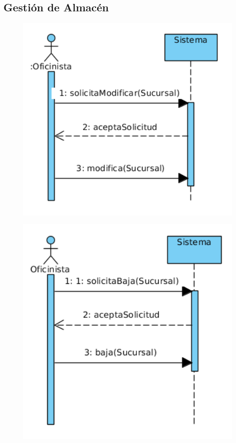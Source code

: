 \subsection{Gestión de Almacén}
\begin{figure}[H]
	\centering
	\includegraphics[width=16cm]{8}
\end{figure}
\begin{figure}[H]
	\centering
	\includegraphics[width=16cm]{9}
\end{figure}
